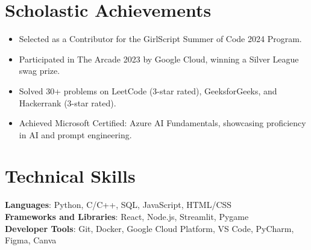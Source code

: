 \documentclass[letterpaper,11pt]{article}
\newcommand{\resumeItem}[1]{
  \item\small{
    {#1 \vspace{-2pt}}
  }
}
\newcommand{\resumeItemListStart}{\begin{itemize}}
\newcommand{\resumeItemListEnd}{\end{itemize}\vspace{-5pt}}
\begin{document}
\section{Scholastic Achievements}
\resumeItemListStart
        \resumeItem{Selected as a Contributor for the GirlScript Summer of Code 2024 Program.}
        \resumeItem{Participated in The Arcade 2023 by Google Cloud, winning a Silver League swag prize.}
        \resumeItem{Solved 30+ problems on LeetCode (3-star rated), GeeksforGeeks, and Hackerrank (3-star rated).}
        \resumeItem{Achieved Microsoft Certified: Azure AI Fundamentals, showcasing proficiency in AI and prompt engineering.}
      \resumeItemListEnd

\section{Technical Skills}
 \begin{itemize}[leftmargin=0.15in, label={}]
    \small{\item{
     \textbf{Languages}{: Python, C/C++, SQL, JavaScript, HTML/CSS} \\
     \textbf{Frameworks and Libraries}{: React, Node.js, Streamlit, Pygame} \\
     \textbf{Developer Tools}{: Git, Docker, Google Cloud Platform, VS Code, PyCharm, Figma, Canva} \\
    }}
 \end{itemize}

\end{document}
